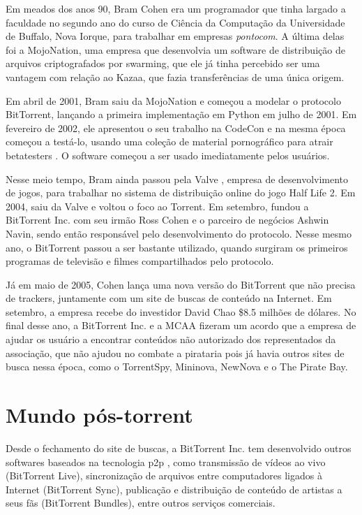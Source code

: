 Em meados dos anos 90, Bram Cohen era um programador que tinha largado a faculdade no
segundo ano do curso de Ciência da Computação da Universidade de Buffalo, Nova Iorque,
para trabalhar em empresas \emph{pontocom}. A última delas foi a MojoNation, uma
empresa que desenvolvia um software de distribuição de arquivos criptografados por
\gls*{swarming}, que ele já tinha percebido ser uma vantagem com relação ao Kazaa, que
fazia transferências de uma única origem.

Em abril de 2001, Bram saiu da MojoNation e começou a modelar o protocolo BitTorrent,
lançando a primeira implementação em Python em julho de 2001. Em fevereiro de 2002, ele
apresentou o seu trabalho na CodeCon \cite{site:codecon} e na mesma época começou a
testá-lo, usando uma coleção de material pornográfico para atrair \glspl{betatester}
\cite{site:bramcohen}. O software começou a ser usado imediatamente pelos usuários.

Nesse meio tempo, Bram ainda passou pela Valve \cite{wiki:bramcohen}, empresa de
desenvolvimento de jogos, para trabalhar no sistema de distribuição online do jogo
Half Life 2. Em 2004, saiu da Valve e voltou o foco ao Torrent. Em setembro, fundou a
BitTorrent Inc. com seu irmão Ross Cohen e o parceiro de negócios Ashwin Navin,
sendo então responsável pelo desenvolvimento do protocolo. Nesse mesmo ano, o
BitTorrent passou a ser bastante utilizado, quando surgiram os primeiros programas de
televisão e filmes compartilhados pelo protocolo.

Já em maio de 2005, Cohen lança uma nova versão do BitTorrent que não precisa de
\glspl*{tracker}, juntamente com um site
de buscas de conteúdo na Internet. Em setembro, a empresa recebe do investidor David
Chao \$8.5 milhões de dólares. No final desse ano, a BitTorrent Inc. e a MCAA
\cite{wiki:mcaa} fizeram um acordo que a empresa de ajudar os usuário a encontrar
conteúdos não autorizado dos representados da associação, que não ajudou no combate a
pirataria pois já havia outros sites de busca nessa época, como o TorrentSpy, Mininova,
NewNova e o The Pirate Bay.

\section{Mundo pós-torrent}

Desde o fechamento do site de buscas, a BitTorrent Inc. tem desenvolvido outros
softwares baseados na tecnologia \gls*{p2p} \cite{site:bittorrent}, como transmissão de
vídeos ao vivo (BitTorrent Live), sincronização de arquivos entre computadores ligados
à Internet (BitTorrent Sync), publicação e distribuição de conteúdo de artistas a seus
fãs (BitTorrent Bundles), entre outros serviços comerciais.

